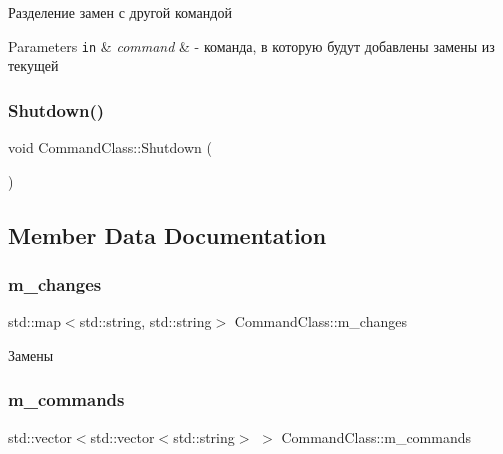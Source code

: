 Разделение замен с другой командой 


\begin{DoxyParams}[1]{Parameters}
\mbox{\tt in}  & {\em command} & -\/ команда, в которую будут добавлены замены из текущей \\
\hline
\end{DoxyParams}
\mbox{\label{class_command_class_a78052a59a127388c298c6165481d98a6}} 
\subsubsection{\texorpdfstring{Shutdown()}{Shutdown()}}
{\footnotesize\ttfamily void Command\+Class\+::\+Shutdown (\begin{DoxyParamCaption}{ }\end{DoxyParamCaption})}



\subsection{Member Data Documentation}
\mbox{\label{class_command_class_af174f90e955a7ebe88fa66033a830961}} 
\subsubsection{\texorpdfstring{m\+\_\+changes}{m\_changes}}
{\footnotesize\ttfamily std\+::map$<$std\+::string, std\+::string$>$ Command\+Class\+::m\+\_\+changes\hspace{0.3cm}{\ttfamily [private]}}



Замены 

\mbox{\label{class_command_class_a62f495584385f25ae53ebad1964324fd}} 
\subsubsection{\texorpdfstring{m\+\_\+commands}{m\_commands}}
{\footnotesize\ttfamily std\+::vector$<$std\+::vector$<$std\+::string$>$ $>$ Command\+Class\+::m\+\_\+commands\hspace{0.3cm}{\ttfamily [private]}}



